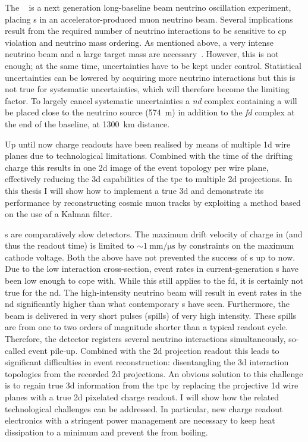 The \dune{}~\cite{dune1, dune2, dune3, dune4} is a next generation long-baseline beam neutrino oscillation experiment, placing \lartpc{}s in an accelerator-produced muon neutrino beam.
Several implications result from the required number of neutrino interactions to be sensitive to \gls{cp} violation and neutrino mass ordering.
As mentioned above, a very intense neutrino beam and a large target mass are necessary~\cite{dune3, dune4}.
However, this is not enough; at the same time, uncertainties have to be kept under control.
Statistical uncertainties can be lowered by acquiring more neutrino interactions but this is not true for systematic uncertainties, which will therefore become the limiting factor.
To largely cancel systematic uncertainties a \emph{\gls{nd}} complex containing a \lartpc{} will be placed close to the neutrino source (\SI{574}{\metre}) in addition to the \emph{\gls{fd}} complex at the end of the baseline, at \SI{1300}{\kilo\metre} distance.

Up until now \lartpc{} charge readouts have been realised by means of multiple \gls{1d} wire planes due to technological limitations.
Combined with the time of the drifting charge this results in one \gls{2d} image of the event topology per wire plane, effectively reducing the \gls{3d} capabilities of the \gls{tpc} to multiple \gls{2d} projections.
In this thesis I will show how to implement a true \gls{3d} \lartpc{} and demonstrate its performance by reconstructing cosmic muon tracks by exploiting a method based on the use of a Kalman filter.

\lartpc{}s are comparatively slow detectors.
The maximum drift velocity of charge in \lar{} (and thus the readout time) is limited to $\sim{\SI{1}{\milli\metre\per\micro\second}}$ by constraints on the maximum cathode voltage.
Both the above have not prevented the success of \lartpc{}s up to now.
Due to the low interaction cross-section, event rates in current-generation \lartpc{}s have been low enough to cope with.
While this still applies to the \dune{} \gls{fd}, it is certainly not true for the \gls{nd}.
The high-intensity neutrino beam will result in event rates in the \gls{nd} significantly higher than what contemporary \lartpc{}s have seen.
Furthermore, the beam is delivered in very short pulses (spills) of very high intensity.
These spills are from one to two orders of magnitude shorter than a typical \lartpc{} readout cycle.
Therefore, the detector registers several neutrino interactions simultaneously, so-called event pile-up.
Combined with the \gls{2d} projection readout this leads to significant difficulties in event reconstruction: disentangling the \gls{3d} interaction topologies from the recorded \gls{2d} projections.
An obvious solution to this challenge is to regain true \gls{3d} information from the \gls{tpc} by replacing the projective \gls{1d} wire planes with a true \gls{2d} pixelated charge readout.
I will show how the related technological challenges can be addressed.
In particular, new charge readout electronics with a stringent power management are necessary to keep heat dissipation to a minimum and prevent the \lar{} from boiling.

